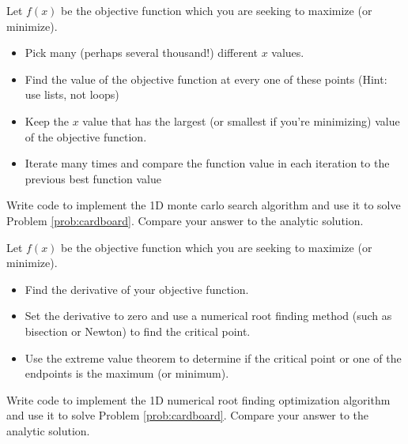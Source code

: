 \begin{algorithm}
    Let $f(x)$ be the objective function which you are seeking to maximize (or minimize).
    \begin{itemize}
        \item Pick many (perhaps several thousand!) different $x$ values.
        \item Find the value of the objective function at every one of
            these points (Hint: use lists, not loops)
        \item Keep the $x$ value that has the largest (or smallest if
            you're minimizing) value of the objective function.
        \item Iterate many times and compare the function value in each
            iteration to the previous best function value
    \end{itemize}
\end{algorithm}
\begin{problem}
    Write code to implement the 1D monte carlo search algorithm and use it to solve
    Problem \ref{prob:cardboard}. Compare your answer to the analytic solution.
\end{problem}

\begin{algorithm}
    Let $f(x)$ be the objective function which you are seeking to maximize (or minimize).
    \begin{itemize}
        \item Find the derivative of your objective function.
        \item Set the derivative to zero and use a numerical root finding
            method (such as bisection or Newton) to find the critical
            point.
        \item Use the extreme value theorem to determine if the critical point or one of
            the endpoints is the maximum (or minimum).
    \end{itemize}
\end{algorithm}
\begin{problem}
    Write code to implement the 1D numerical root finding optimization algorithm and use
    it to solve Problem \ref{prob:cardboard}. Compare your answer to the analytic solution.
\end{problem}





